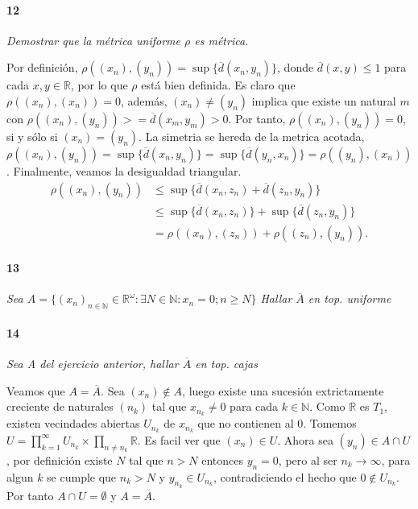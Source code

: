 \documentclass[12pt]{article}
\begin{document}
\paragraph{12}
\textit{Demostrar que la métrica uniforme $\rho$ es métrica.}

Por definición, $\rho((x_n),(y_n))=\sup{\{\overline{d}(x_n,y_n)\}}$, donde $\overline{d}(x,y) \leq 1$ para cada $x,y \in \mathbb{R}$, por lo que $\rho$ está bien definida.
Es claro que $\rho((x_n),(x_n))=0$, además, $(x_n) \neq (y_n)$ implica que existe un natural $m$ con $\rho((x_n),(y_n))>=\overline{d}(x_m,y_m)>0$. Por tanto, $\rho((x_n),(y_n))=0$, si y sólo si $(x_n)=(y_n)$.
La simetria se hereda de la metrica acotada, $\rho((x_n),(y_n))=\sup{\{\overline{d}(x_n,y_n)\}}=\sup{\{\overline{d}(y_n,x_n)\}}=\rho((y_n),(x_n))$. Finalmente, veamos la desigualdad triangular.
\begin{align*}
    \rho((x_n),(y_n)) &\leq \sup{\{\overline{d}(x_n,z_n)+\overline{d}(z_n,y_n)\}} \\
                      &\leq \sup{\{\overline{d}(x_n,z_n)\}}+\sup{\{\overline{d}(z_n,y_n)\}}\\
                      &=\rho((x_n),(z_n))+\rho((z_n),(y_n)).
\end{align*}
\paragraph{13}
\textit{Sea $A=\{(x_n)_{n\in\mathbb{N}}\in\mathbb{R}^\omega : \exists N\in\mathbb{N}: x_n =0 ; n \geq N \}$
Hallar $\overline{A}$ en top. uniforme}

\paragraph{14}
\textit{Sea A del ejercicio anterior, hallar $\overline{A}$ en top. cajas}

Veamos que $A=\overline{A}$. Sea $(x_n) \notin A$, luego existe una sucesión extrictamente creciente de naturales $(n_k)$ tal que $x_{n_k} \neq 0$ para cada $k \in \mathbb{N}$. Como $\mathbb{R}$ es $T_1$, existen vecindades abiertas $U_{n_k}$ de $x_{n_k}$ que no contienen al $0$.
Tomemos $U=\prod_{k=1}^{\infty}U_{n_k} \times \prod_{n \neq n_k} \mathbb{R}$. Es facil ver que $(x_n) \in U$. Ahora sea $(y_n) \in A \cap U$, por definición existe $N$ tal que $n>N$ entonces $y_n=0$, pero al ser $n_k \to \infty$, para algun $k$ se cumple que
$n_k>N$ y $y_{n_k} \in U_{n_k}$, contradiciendo el hecho que $0 \notin U_{n_k}$. Por tanto $A \cap U = \emptyset$ y $A=\overline{A}$.
\end{document}
